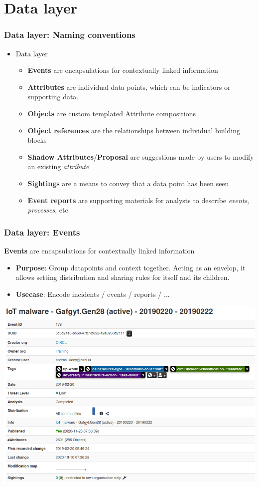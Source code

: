\section{Data layer}
\begin{frame}
    \frametitle{Data layer: Naming conventions}
     \begin{itemize}
            \item Data layer
            \begin{itemize}
                \item {\bf Events} are encapsulations for contextually linked information
                \item {\bf Attributes} are individual data points, which can be indicators or supporting data.
                \item {\bf Objects} are custom templated Attribute compositions
                \item {\bf Object references} are the relationships between individual building blocks
                \item {\bf Shadow Attributes}/{\bf Proposal} are suggestions made by users to modify an existing {\it attribute}
                \item {\bf Sightings} are a means to convey that a data point has been seen
                \item {\bf Event reports} are supporting materials for analysts to describe {\it events}, {\it processes}, etc
            \end{itemize}
    \end{itemize}
\end{frame}

\begin{frame}[fragile]
    \frametitle{Data layer: Events}
        {\bf Events} are encapsulations for contextually linked information
        \begin{itemize}
            \item[] \textbf{Purpose}: Group datapoints and context together. Acting as an envelop, it allows setting distribution and sharing rules for itself and its children.
            \item[] \textbf{Usecase}: Encode incidents / events / reports / ...
        \end{itemize}
        \begin{center}
            \includegraphics[width=0.7\linewidth]{screenshots/ui-event.png}
        \end{center}
\end{frame}

